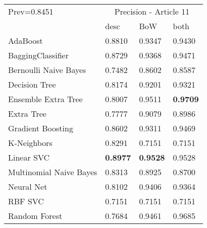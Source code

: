 \begin{tabular}{|l|l|l|l| }
\hline
Prev=0.8451 &  \multicolumn{3}{c|}{Precision - Article 11} \\
\cline{2-4} & desc & BoW & both \\ \hline
AdaBoost                & 0.8810 & 0.9347 & 0.9430\\
BaggingClassifier       & 0.8729 & 0.9368 & 0.9471\\
Bernoulli Naive Bayes   & 0.7482 & 0.8602 & 0.8587\\
Decision Tree           & 0.8174 & 0.9201 & 0.9321\\
Ensemble Extra Tree     & 0.8007 & 0.9511 & {\bf 0.9709}\\
Extra Tree              & 0.7777 & 0.9079 & 0.8986\\
Gradient Boosting       & 0.8602 & 0.9311 & 0.9469\\
K-Neighbors             & 0.8291 & 0.7151 & 0.7151\\
Linear SVC              & {\bf 0.8977} & {\bf 0.9528} & 0.9528\\
Multinomial Naive Bayes & 0.8313 & 0.8925 & 0.8700\\
Neural Net              & 0.8102 & 0.9406 & 0.9364\\
RBF SVC                 & 0.7151 & 0.7151 & 0.7151\\
Random Forest           & 0.7684 & 0.9461 & 0.9685\\
\hline
\end{tabular}